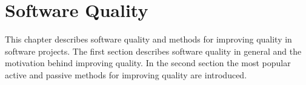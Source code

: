 
 \chapter{Software Quality}
 
This chapter describes software quality and methods for improving quality in software projects. The first section describes software quality in general and the motivation behind improving quality. In the second section the most popular active and passive methods for improving quality are introduced.

 
 
 
